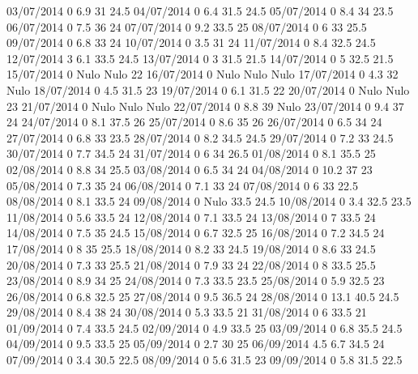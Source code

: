 03/07/2014  0      6.9    31     24.5 
04/07/2014  0      6.4    31.5   24.5 
05/07/2014  0      8.4    34     23.5 
06/07/2014  0      7.5    36     24 
07/07/2014  0      9.2    33.5   25 
08/07/2014  0      6      33     25.5 
09/07/2014  0      6.8    33     24 
10/07/2014  0      3.5    31     24 
11/07/2014  0      8.4    32.5   24.5 
12/07/2014  3      6.1    33.5   24.5 
13/07/2014  0      3      31.5   21.5 
14/07/2014  0      5      32.5   21.5 
15/07/2014  0     Nulo   Nulo    22 
16/07/2014  0     Nulo   Nulo   Nulo
17/07/2014  0      4.3    32    Nulo
18/07/2014  0      4.5    31.5   23 
19/07/2014  0      6.1    31.5   22 
20/07/2014  0     Nulo   Nulo    23 
21/07/2014  0     Nulo   Nulo   Nulo
22/07/2014  0      8.8    39    Nulo
23/07/2014  0      9.4    37     24 
24/07/2014  0      8.1    37.5   26 
25/07/2014  0      8.6    35     26 
26/07/2014  0      6.5    34     24 
27/07/2014  0      6.8    33     23.5 
28/07/2014  0      8.2    34.5   24.5 
29/07/2014  0      7.2    33     24.5 
30/07/2014  0      7.7    34.5   24 
31/07/2014  0      6      34     26.5 
01/08/2014  0      8.1    35.5   25 
02/08/2014  0      8.8    34     25.5 
03/08/2014  0      6.5    34     24 
04/08/2014  0      10.2   37     23 
05/08/2014  0      7.3    35     24 
06/08/2014  0      7.1    33     24 
07/08/2014  0      6      33     22.5 
08/08/2014  0      8.1    33.5   24 
09/08/2014  0     Nulo    33.5   24.5 
10/08/2014  0      3.4    32.5   23.5 
11/08/2014  0      5.6    33.5   24 
12/08/2014  0      7.1    33.5   24 
13/08/2014  0      7      33.5   24 
14/08/2014  0      7.5    35     24.5 
15/08/2014  0      6.7    32.5   25 
16/08/2014  0      7.2    34.5   24 
17/08/2014  0      8      35     25.5 
18/08/2014  0      8.2    33     24.5 
19/08/2014  0      8.6    33     24.5 
20/08/2014  0      7.3    33     25.5 
21/08/2014  0      7.9    33     24 
22/08/2014  0      8      33.5   25.5 
23/08/2014  0      8.9    34     25 
24/08/2014  0      7.3    33.5   23.5 
25/08/2014  0      5.9    32.5   23 
26/08/2014  0      6.8    32.5   25 
27/08/2014  0      9.5    36.5   24 
28/08/2014  0      13.1   40.5   24.5 
29/08/2014  0      8.4    38     24 
30/08/2014  0      5.3    33.5   21 
31/08/2014  0      6      33.5   21 
01/09/2014  0      7.4    33.5   24.5 
02/09/2014  0      4.9    33.5   25 
03/09/2014  0      6.8    35.5   24.5 
04/09/2014  0      9.5    33.5   25 
05/09/2014  0      2.7    30     25 
06/09/2014  4.5    6.7    34.5   24 
07/09/2014  0      3.4    30.5   22.5 
08/09/2014  0      5.6    31.5   23 
09/09/2014  0      5.8    31.5   22.5 
